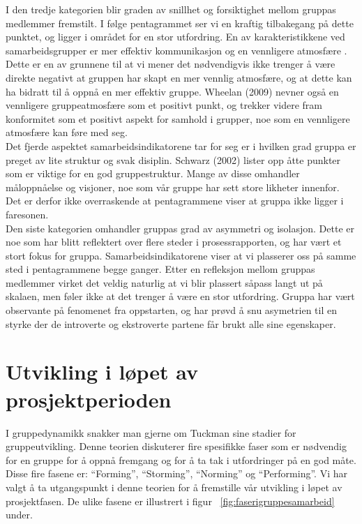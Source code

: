 I den tredje kategorien blir graden av snillhet og forsiktighet mellom gruppas medlemmer fremstilt. I følge pentagrammet ser vi en kraftig tilbakegang på dette punktet, og ligger i området for en stor utfordring. En av karakteristikkene ved samarbeidsgrupper er mer effektiv kommunikasjon og en vennligere atmosfære \citep{fasilitator}. Dette er en av grunnene til at vi mener det nødvendigvis ikke trenger å være direkte negativt at gruppen har skapt en mer vennlig atmosfære, og at dette kan ha bidratt til å oppnå en mer effektiv gruppe. Wheelan (2009) nevner også en vennligere gruppeatmosfære som et positivt punkt, og trekker videre fram konformitet som et positivt aspekt for samhold i grupper, noe som en vennligere atmosfære kan føre med seg.\\

Det fjerde aspektet samarbeidsindikatorene tar for seg er i hvilken grad gruppa er preget av lite struktur og svak disiplin. Schwarz (2002) lister opp åtte punkter som er viktige for en god gruppestruktur. Mange av disse omhandler måloppnåelse og visjoner, noe som vår gruppe har sett store likheter innenfor. Det er derfor ikke overraskende at pentagrammene viser at gruppa ikke ligger i faresonen.\\

Den siste kategorien omhandler gruppas grad av asymmetri og isolasjon. Dette er noe som har blitt reflektert over flere steder i prosessrapporten, og har vært et stort fokus for gruppa. Samarbeidsindikatorene viser at vi plasserer oss på samme sted i pentagrammene begge ganger. Etter en refleksjon mellom gruppas medlemmer virket det veldig naturlig at vi blir plassert såpass langt ut på skalaen, men føler ikke at det trenger å være en stor utfordring. Gruppa har vært observante på fenomenet fra oppstarten, og har prøvd å snu asymetrien til en styrke der de introverte og ekstroverte partene får brukt alle sine egenskaper.\\


\section{Utvikling i løpet av prosjektperioden}
\label{sec:utvikling}
I gruppedynamikk snakker man gjerne om Tuckman sine stadier for gruppeutvikling. Denne teorien diskuterer fire spesifikke faser som er nødvendig for en gruppe for å oppnå fremgang og for å ta tak i utfordringer på en god måte. Disse fire fasene er: ``Forming'', ``Storming'', ``Norming'' og ``Performing''. Vi har valgt å ta utgangspunkt i denne teorien for å fremstille vår utvikling i løpet av prosjektfasen. De ulike fasene er illustrert i figur ~\ref{fig:faserigruppesamarbeid} under.\\

